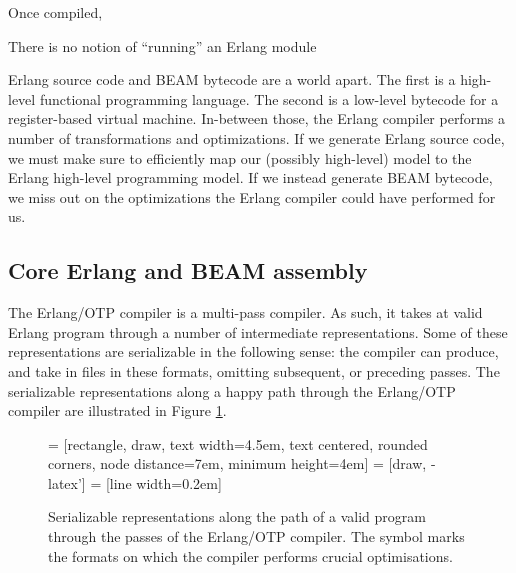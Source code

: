 Once compiled, 

There is no notion of ``running'' an Erlang module

Erlang source code and BEAM bytecode are a world apart. The first is a
high-level functional programming language. The second is a low-level
bytecode for a register-based virtual machine. In-between those, the
Erlang compiler performs a number of transformations and
optimizations. If we generate Erlang source code, we must make sure to
efficiently map our (possibly high-level) model to the Erlang
high-level programming model. If we instead generate BEAM bytecode, we
miss out on the optimizations the Erlang compiler could have performed
for us.

\subsection{Core Erlang and BEAM assembly}

The Erlang/OTP compiler is a multi-pass compiler. As such, it takes at
valid Erlang program through a number of intermediate representations.
Some of these representations are serializable in the following sense:
the compiler can produce, and take in files in these formats, omitting
subsequent, or preceding passes. The serializable representations
along a happy path through the Erlang/OTP compiler are illustrated in
Figure \ref{fig:serializable-representations}.

\NewDocumentCommand\optimizing{}{$\circlearrowright$}

\begin{figure}[h]
\centering
{} = [rectangle, draw, 
    text width=4.5em, text centered, rounded corners,
    node distance=7em,
    minimum height=4em]
 = [draw, -latex']
 = [line width=0.2em]


\caption{Serializable representations along the path of a valid
program through the passes of the Erlang/OTP compiler. The symbol
\optimizing{} marks the formats on which the compiler performs crucial
optimisations.}

\label{fig:serializable-representations}
\end{figure}

